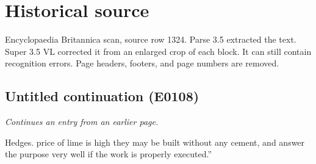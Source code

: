 \documentclass{article}
\begin{document}
\section*{Historical source}
Encyclopaedia Britannica scan, source row 1324. Parse 3.5 extracted the text. Super 3.5 VL corrected it from an enlarged crop of each block. It can still contain recognition errors.
Page headers, footers, and page numbers are removed.

\subsection*{Untitled continuation (E0108)}
\textit{Continues an entry from an earlier page.}

Hedges. price of lime is high they may be built without any cement, and answer the purpose very well if the work is properly executed.”
\end{document}
